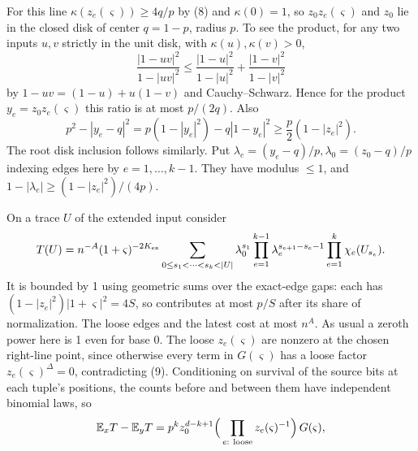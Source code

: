 \documentclass[11pt]{article}
\begin{document}
For this line \(\kappa(z_e(\varsigma))\ge 4q/p\) by (8) and \(\kappa(0)=1\), so \(z_0 z_e(\varsigma)\) and \(z_0\) lie in the closed disk of center \(q=1-p\), radius \(p\). To see the product, for any two inputs \(u,v\) strictly in the unit disk, with \(\kappa(u),\kappa(v)>0\),
\[
 \frac{|1-u v|^2}{1-|u v|^2}
 \le \frac{|1-u|^2}{1-|u|^2}+\frac{|1-v|^2}{1-|v|^2}
\]
by \(1-uv=(1-u)+u(1-v)\) and Cauchy--Schwarz. Hence for the product \(y_e=z_0 z_e(\varsigma)\) this ratio is at most \(p/(2q)\). Also
\[
 p^2-|y_e-q|^2=p(1-|y_e|^2)-q|1-y_e|^2
 \ge \frac p2(1-|z_e|^2).
\]
The root disk inclusion follows similarly. Put \(\lambda_e=(y_e-q)/p,\lambda_0=(z_0-q)/p\) indexing edges here by \(e=1,\ldots,k-1\). They have modulus \(\le1\), and \(1-|\lambda_e|\ge (1-|z_e|^2)/(4p)\).

On a trace \(U\) of the extended input consider
\[
 T(U)=n^{-A}(1+\varsigma)^{-2K_{\rm ex}}
 \sum_{0\le s_1<\cdots<s_k<|U|}
  \lambda_0^{s_1}\prod_{e=1}^{k-1}\lambda_e^{s_{e+1}-s_e-1}
  \prod_{e=1}^k\chi_e(U_{s_e}).
\]
It is bounded by 1 using geometric sums over the exact-edge gaps: each has \((1-|z_e|^2)|1+\varsigma|^2=4 S\), so contributes at most \(p/S\) after its share of normalization. The loose edges and the latest cost at most \(n^A\). As usual a zeroth power here is 1 even for base 0. The loose \(z_e(\varsigma)\) are nonzero at the chosen right-line point, since otherwise every term in \(G(\varsigma)\) has a loose factor \(z_e(\varsigma)^\Delta=0\), contradicting (9). Conditioning on survival of the source bits at each tuple's positions, the counts before and between them have independent binomial laws, so
\[
 \mathbb E_x T-\mathbb E_y T =
 p^k z_0^{d-k+1}\Big(\prod_{e:\ \rm loose} z_e(\varsigma)^{-1}\Big)\,G(\varsigma),
\]
\end{document}
